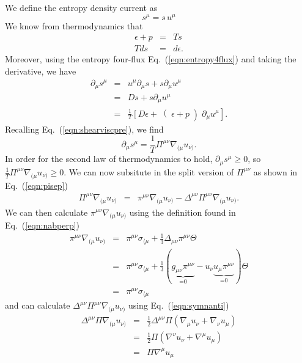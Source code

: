 \documentclass[aps,article]{revtex4}
\begin{document}
We define the entropy density current as 
\begin{equation}\label{eqn:entropy4flux}
s^{\mu}=s\,u^{\mu}
\end{equation}
We know from thermodynamics that
\begin{eqnarray}
\epsilon+p&=&Ts\nonumber\\
Tds&=&d\epsilon.
\end{eqnarray}
Moreover, using the entropy four-flux Eq.\ (\ref{eqn:entropy4flux}) and taking the derivative, we have
\begin{eqnarray}
\partial_{\mu} s^{\mu}&=&u^{\mu}\partial_{\mu}s+s\partial_{\mu}u^{\mu}\nonumber\\
&=&Ds+s\partial_{\mu}u^{\mu}\nonumber\\
&=&\frac{1}{T}\left[D\epsilon+\right(\epsilon+p\left)\partial_{\mu}u^{\mu}\right].
\end{eqnarray}
Recalling Eq.\ (\ref{eqn:shearviscpre}), we find
\begin{equation}\label{eqn:boxent}
\boxed{\partial_{\mu} s^{\mu}=\frac{1}{T}\Pi^{\mu\nu}\nabla_{(\mu}u_{\nu)}}.
\end{equation}
In order for the second law of thermodynamics to hold, $\partial_{\mu} s^{\mu}\geq0$, so $\frac{1}{T}\Pi^{\mu\nu}\nabla_{(\mu}u_{\nu)}\geq0$. We can now subsitute in the split version of $\Pi^{\mu\nu}$ as shown in Eq.\ (\ref{eqn:pisep}) 
\begin{eqnarray}\label{eqn:pinab}
\Pi^{\mu\nu}\nabla_{(\mu}u_{\nu)}&=&\pi^{\mu\nu}\nabla_{(\mu}u_{\nu)}-\Delta^{\mu\nu}\Pi^{\mu\nu}\nabla_{(\mu}u_{\nu)}.
\end{eqnarray}
We can then calculate $\pi^{\mu\nu}\nabla_{(\mu}u_{\nu)}$ using the definition found in Eq.\ (\ref{eqn:nabperp})
\begin{eqnarray}
\pi^{\mu\nu}\nabla_{(\mu}u_{\nu)}&=&\pi^{\mu\nu}\sigma_{\langle\mu}+\frac{1}{3}\Delta_{\mu\nu}\pi^{\mu\nu}\Theta\nonumber\\
&=&\pi^{\mu\nu}\sigma_{\langle\mu}+\frac{1}{3}(\underbrace{g_{\mu\nu}\pi^{\mu\nu}}_\textrm{=0}-u_{\nu}\underbrace{u_{\mu}\pi^{\mu\nu}}_\textrm{=0})\Theta\nonumber\\
&=&\pi^{\mu\nu}\sigma_{\langle\mu}
\end{eqnarray}
and can calculate $\Delta^{\mu\nu}\Pi^{\mu\nu}\nabla_{(\mu}u_{\nu)}$ using Eq.\ (\ref{eqn:symnanti})
\begin{eqnarray}
\Delta^{\mu\nu}\Pi\nabla_{(\mu}u_{\nu)}&=&\frac{1}{2}\Delta^{\mu\nu}\Pi\left(\nabla_{\mu}u_{\nu}+\nabla_{\nu}u_{\mu}\right)\nonumber\\
&=&\frac{1}{2}\Pi\left(\nabla^{\nu}u_{\nu}+\nabla^{\mu}u_{\mu}\right)\nonumber\\
&=&\Pi\nabla^{\mu}u_{\mu}
\end{eqnarray}
\end{document}
